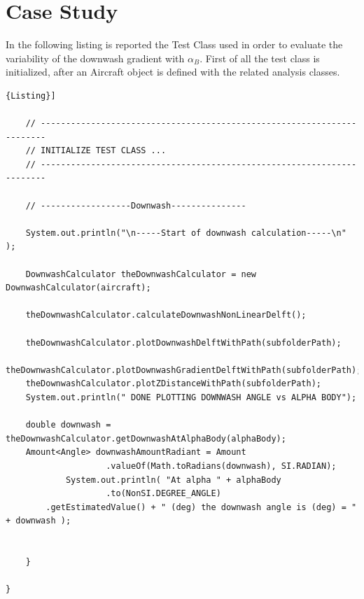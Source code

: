 \section{Case Study}

In the following listing is reported the Test Class used in order to evaluate the variability of the downwash gradient with $\alpha_B$. First of all the test class is initialized, after an Aircraft object is defined with the related analysis classes.

\begin{lstlisting}[frame=rbl,caption={{\footnotesize Downwash Test Class}},label= [style=\bfseries]{Listing}]

	// -----------------------------------------------------------------------
	// INITIALIZE TEST CLASS ...
	// -----------------------------------------------------------------------

	// ------------------Downwash---------------

	System.out.println("\n-----Start of downwash calculation-----\n" );

	DownwashCalculator theDownwashCalculator = new DownwashCalculator(aircraft);

	theDownwashCalculator.calculateDownwashNonLinearDelft();

	theDownwashCalculator.plotDownwashDelftWithPath(subfolderPath);
	theDownwashCalculator.plotDownwashGradientDelftWithPath(subfolderPath);
	theDownwashCalculator.plotZDistanceWithPath(subfolderPath);
	System.out.println(" DONE PLOTTING DOWNWASH ANGLE vs ALPHA BODY");

	double downwash = theDownwashCalculator.getDownwashAtAlphaBody(alphaBody);
	Amount<Angle> downwashAmountRadiant = Amount
					.valueOf(Math.toRadians(downwash), SI.RADIAN);
			System.out.println( "At alpha " + alphaBody
					.to(NonSI.DEGREE_ANGLE)
		.getEstimatedValue() + " (deg) the downwash angle is (deg) = " + downwash );
	

	}

}
\end{lstlisting}


